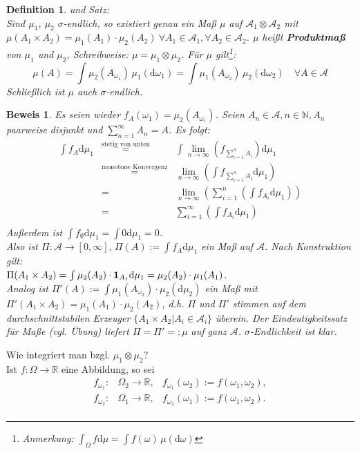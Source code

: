 \documentclass[a4paper,11pt]{scrbook}
\newcommand{\R}{{\mathbb R}}
\newcommand{\N}{{\mathbb N}}
\newcommand{\ind}{\text{\bf{1}}}
\def\AA{ \mathcal{A} }
\def\d{\mbox{d}}
\newtheorem{Def}{Definition}[chapter]
\theoremstyle{nonumberplain}
\newtheorem{Bew}{Beweis}
\begin{document}
\begin{Def} und Satz: \label{Def3.1}\\
Sind $\mu_1$, $\mu_2$ $\sigma$-endlich, so existiert genau ein Maß $\mu$ auf $\AA_1\otimes\AA_2$ mit $\mu(A_1\times A_2)=\mu_1(A_1)\cdot\mu_2(A_2)\ \forall A_1\in\AA_1,\forall A_2\in\AA_2$. $\mu$ heißt \textbf{Produktmaß} von $\mu_1$ und $\mu_2$, Schreibweise: $\mu=\mu_1\otimes\mu_2$. Für $\mu$ gilt\footnote{Anmerkung: $\int_\Omega f\d\mu=\int f(\omega)\,\mu(\d\omega)$}: \\
\begin{displaymath}
\mu(A) = \int\mu_2(A_{\omega_1})\,\mu_1(\d\omega_1) = \int\mu_1(A_{\omega_2})\,\mu_2(\d\omega_2)\quad\forall A\in\AA
\end{displaymath}
Schließlich ist $\mu$ auch $\sigma$-endlich.
\end{Def}
\begin{Bew} Es seien wieder $f_A(\omega_1)=\mu_2(A_{\omega_1})$. Seien $A_n\in\AA, n\in\N, A_n$ paarweise disjunkt und $\sum_{n=1}^{\infty}A_n=A$. Es folgt:
\begin{eqnarray*}
\int f_A\d\mu_1 &\stackrel{\text{stetig von unten}}{=}& \int\lim_{n\to\infty}\left( f_{\sum_{i=1}^n A_i}\right)\d\mu_1 \\
 &\stackrel{\text{monotone Konvergenz}}{=}& \lim_{n\to\infty}\left(\int f_{\sum_{i=1}^n A_i}\d\mu_1\right) \\
 &=& \lim_{n\to\infty}\left(\sum_{i=1}^n\left(\int f_{A_i}\d\mu_1\right)\right) \\
 &=& \sum_{i=1}^{\infty}\left(\int f_{A_i}\d\mu_1\right) \\
\end{eqnarray*}
Außerdem ist $\int f_{\emptyset}\d\mu_1=\int 0\d\mu_1=0$. \\
Also ist $\Pi: \AA\to\left[0,\infty\right],\,\Pi(A):=\int f_A\d\mu_1$ ein Maß auf $\AA$. Nach Konstruktion gilt: \\
$\Pi(A_1\times A_2)=\int \mu_2(A_2)\cdot \ind_{A_1}\d\mu_1=\mu_2(A_2)\cdot\mu_1(A_1)$. \\
Analog ist $\Pi'(A):=\int\mu_1(A_{\omega_2})\cdot\mu_2(\d\mu_2)$ ein Maß mit $\Pi'(A_1\times A_2)=\mu_1(A_1)\cdot\mu_2(A_2)$, d.h. $\Pi$ und $\Pi'$ stimmen auf dem durchschnittstabilen Erzeuger $\{A_1\times A_2|A_i\in\AA_i\}$ überein. Der Eindeutigkeitssatz für Maße (vgl. Übung) liefert $\Pi=\Pi' =: \mu$ auf ganz $\AA$. $\sigma$-Endlichkeit ist klar.
\end{Bew}

Wie integriert man bzgl. $\mu_1\otimes\mu_2$? \\
Ist $f:\Omega\to\R$ eine Abbildung, so sei
\begin{eqnarray*}
f_{\omega_1}: & \Omega_2\to\R, & f_{\omega_1}\left(\omega_2\right):=f\left(\omega_1,\omega_2\right), \\
f_{\omega_2}: & \Omega_1\to\R, & f_{\omega_2}\left(\omega_1\right):=f\left(\omega_1,\omega_2\right). \\
\end{eqnarray*}
\end{document}
